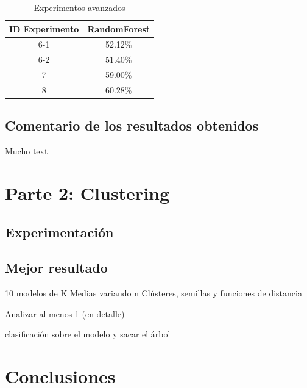 \documentclass[12pt,a4paper, xcolor=table]{article}
\begin{document}
        \begin{table}[h]
            \centering
            \begin{tabular}{|c|c|}
            \hline
            \rowcolor[HTML]{DAE8FC}
            \textbf{ID Experimento} & \textbf{RandomForest} \\ \hline
            6-1                     & 52.12\%               \\ \hline
            6-2                     & 51.40\%               \\ \hline
            7                       & 59.00\%               \\ \hline
            8                       & 60.28\%               \\ \hline
            \end{tabular}
            \caption{Experimentos avanzados}
                \label{fig:graf_exp1}
        \end{table}

    \subsection{Comentario de los resultados obtenidos}
    Mucho text

\section{Parte 2: Clustering}

\subsection{Experimentación}

\subsection{Mejor resultado}





 10 modelos de K Medias variando n Clústeres, semillas y funciones de distancia

Analizar al menos 1 (en detalle)

clasificación sobre el modelo y sacar el árbol

\section{Conclusiones}


\clearpage
\end{document}
